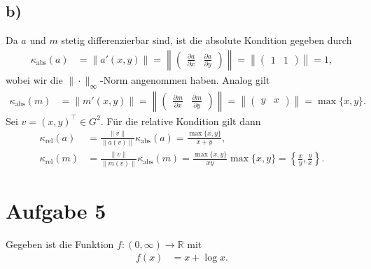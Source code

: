 \documentclass[english, parskip=full]{scrartcl}
\newcommand{\klammer}{}
\newcommand{\tecxt}{}
\begin{document}
\subsection*{b)}
Da $a$ und $m$ stetig differenzierbar sind, ist die absolute Kondition gegeben durch
\begin{align}
\kappa_\tecxt\text{abs}(a) &= \|a'(x,y)\| = \left\| \begin{pmatrix}
\frac{\partial a}{\partial x} & \frac{\partial a}{\partial y}
\end{pmatrix} \right\| = \left\|\begin{pmatrix}
 1 & 1
\end{pmatrix} \right\| = 1,
\end{align}
wobei wir die $\|\cdot\|_\infty$-Norm angenommen haben.
Analog gilt
\begin{align}
\kappa_\tecxt\text{abs}(m) &= \|m'(x,y)\| = \left\| \begin{pmatrix}
\frac{\partial m}{\partial x} & \frac{\partial m}{\partial y}
\end{pmatrix} \right\| = \left\|\begin{pmatrix}
 y & x
\end{pmatrix} \right\| = \max\{x,y\}.
\end{align}
Sei $v=(x,y)^\top\in G^2$. 
Für die relative Kondition gilt dann
\begin{align}
\kappa_\tecxt\text{rel}(a) &= \frac{\|v\|}{\|a(v)\|} \kappa_\tecxt\text{abs}(a) = \frac{\max\{x,y\}}{x+y},\\
\kappa_\tecxt\text{rel}(m) &= \frac{\|v\|}{\|m(v)\|} \kappa_\tecxt\text{abs}(m) = \frac{\max\{x,y\}}{xy} \max\{x,y\} = \klammer\left\{ \frac{x}{y}, \frac{y}{x} \right\}.
\end{align}



\newpage
\section*{Aufgabe 5}
Gegeben ist die Funktion $f:(0,\infty)\rightarrow\mathbb{R}$ mit 
\begin{align}
f(x) &= x + \log x.
\end{align}
\end{document}

